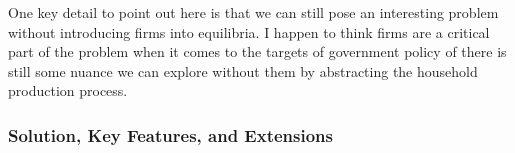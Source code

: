 \documentclass[11pt,english]{article}
\begin{document}
\noindent One key detail to point out here is that we can still pose an interesting problem without introducing firms into equilibria. I happen to think firms are a critical part of the problem when it comes to the targets of government policy of there is still some nuance we can explore without them by abstracting the household production process.

\subsubsection{Solution, Key Features, and Extensions}




\newpage




\end{document}
